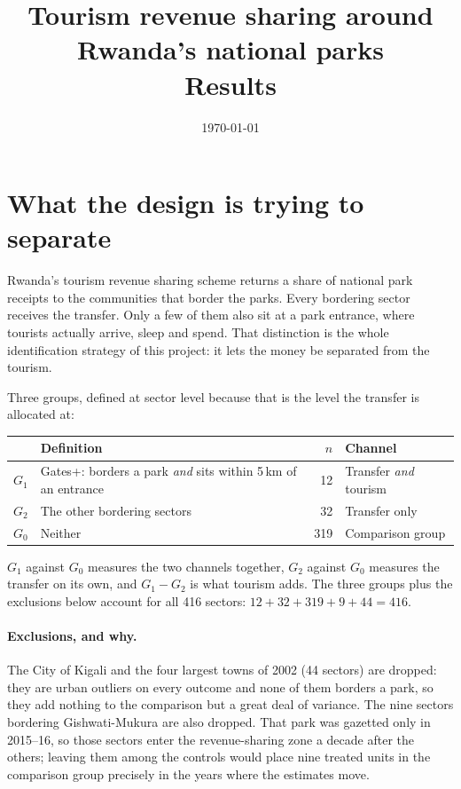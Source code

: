 \documentclass[11pt]{article}
\title{Tourism revenue sharing around Rwanda's national parks\\[2pt]\large Results}
\author{}
\date{\today}
\begin{document}
\maketitle

\section{What the design is trying to separate}

Rwanda's tourism revenue sharing scheme returns a share of national park receipts to the communities
that border the parks. Every bordering sector receives the transfer. Only a few of them also sit at a
park entrance, where tourists actually arrive, sleep and spend. That distinction is the whole
identification strategy of this project: it lets the money be separated from the tourism.

Three groups, defined at sector level because that is the level the transfer is allocated at:

\begin{center}
\begin{tabular}{llr l}
\toprule
& Definition & $n$ & Channel \\
\midrule
$G_1$ & Gates+: borders a park \emph{and} sits within 5\,km of an entrance & 12 & Transfer \emph{and} tourism \\
$G_2$ & The other bordering sectors & 32 & Transfer only \\
$G_0$ & Neither & 319 & Comparison group \\
\bottomrule
\end{tabular}
\end{center}

$G_1$ against $G_0$ measures the two channels together, $G_2$ against $G_0$ measures the transfer on
its own, and $G_1-G_2$ is what tourism adds. The three groups plus the exclusions below account for
all 416 sectors: $12+32+319+9+44=416$.

\paragraph{Exclusions, and why.} The City of Kigali and the four largest towns of 2002 (44 sectors)
are dropped: they are urban outliers on every outcome and none of them borders a park, so they add
nothing to the comparison but a great deal of variance. The nine sectors bordering Gishwati-Mukura
are also dropped. That park was gazetted only in 2015--16, so those sectors enter the revenue-sharing
zone a decade after the others; leaving them among the controls would place nine treated units in the
comparison group precisely in the years where the estimates move.
\end{document}

